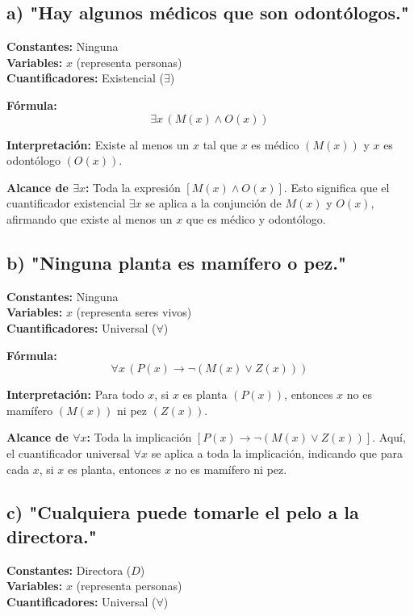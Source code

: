 \documentclass[11pt,letterpaper]{article}
\begin{document}
\subsection*{a) "Hay algunos médicos que son odontólogos."}

\textbf{Constantes:} Ninguna \\
\textbf{Variables:} \( x \) (representa personas) \\
\textbf{Cuantificadores:} Existencial (\( \exists \))

\textbf{Fórmula:}
\[
\exists x \, (M(x) \land O(x))
\]

\textbf{Interpretación:} Existe al menos un \( x \) tal que \( x \) es médico \( (M(x)) \) y \( x \) es odontólogo \( (O(x)) \).

\textbf{ Alcance de \( \exists x \):}
Toda la expresión \( [M(x) \land O(x)] \). Esto significa que el cuantificador existencial \( \exists x \) se aplica a la conjunción de \( M(x) \) y \( O(x) \), afirmando que existe al menos un \( x \) que es médico y odontólogo.

\subsection*{b) "Ninguna planta es mamífero o pez."}

\textbf{Constantes:} Ninguna \\
\textbf{Variables:} \( x \) (representa seres vivos) \\
\textbf{Cuantificadores:} Universal (\( \forall \))

\textbf{Fórmula:}
\[
\forall x \, (P(x) \rightarrow \neg (M(x) \lor Z(x)))
\]

\textbf{Interpretación:} Para todo \( x \), si \( x \) es planta \( (P(x)) \), entonces \( x \) no es mamífero \( (M(x)) \) ni pez \( (Z(x)) \).

\textbf{Alcance de \( \forall x \):}
Toda la implicación \( [P(x) \to \neg (M(x) \lor Z(x))] \). Aquí, el cuantificador universal \( \forall x \) se aplica a toda la implicación, indicando que para cada \( x \), si \( x \) es planta, entonces \( x \) no es mamífero ni pez.

\subsection*{c) "Cualquiera puede tomarle el pelo a la directora."}

\textbf{Constantes:} Directora (\( D \)) \\
\textbf{Variables:} \( x \) (representa personas) \\
\textbf{Cuantificadores:} Universal (\( \forall \))
\end{document}
